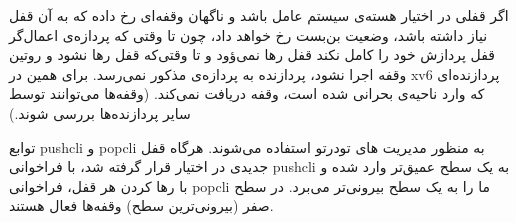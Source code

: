 اگر قفلی در اختیار هسته‌ی سیستم عامل باشد و ناگهان وقفه‌ای رخ داده که به آن قفل نیاز داشته باشد، وضعیت بن‌بست رخ خواهد داد، چون تا وقتی که پردازه‌ی اعمال‌گر قفل پردازش خود را کامل نکند قفل رها نمی‌ؤود و تا وقتی‌که قفل رها نشود و روتین وقفه اجرا نشود، پردازنده به پردازه‌ی مذکور نمی‌رسد. برای همین در
{\selectfont xv6}
پردازنده‌ای که وارد ناحیه‌ی بحرانی شده است، وقفه دریافت نمی‌کند. (وقفه‌ها می‌توانند توسط سایر پردازنده‌ها بررسی شوند.)

توابع
{\selectfont pushcli}
و
{\selectfont popcli}
به منظور مدیریت
های تودرتو استفاده می‌شوند. هرگاه قفل جدیدی در اختیار قرار گرفته شد، با فراخوانی
{\selectfont pushcli}
به یک سطح عمیق‌تر وارد شده و با رها کردن هر قفل، فراخوانی
{\selectfont popcli}
ما را به یک سطح بیرونی‌تر می‌برد. در سطح صفر (بیرونی‌ترین سطح) وقفه‌ها فعال هستند.
